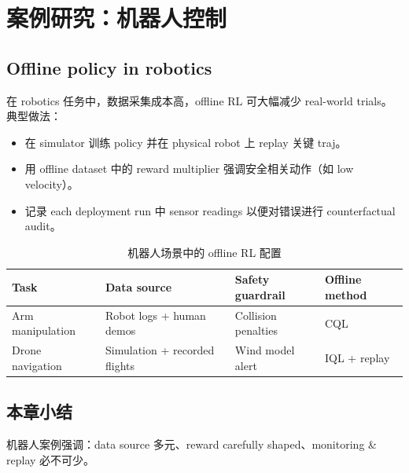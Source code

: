 \section{案例研究：机器人控制}

\subsection{Offline policy in robotics}

在 robotics 任务中，数据采集成本高，offline RL 可大幅减少 real-world trials。典型做法：

\begin{itemize}
    \item 在 simulator 训练 policy 并在 physical robot 上 replay 关键 traj。
    \item 用 offline dataset 中的 reward multiplier 强调安全相关动作（如 low velocity）。
    \item 记录 each deployment run 中 sensor readings 以便对错误进行 counterfactual audit。
\end{itemize}

\begin{table}[H]
\centering
\begin{tabular}{p{} p{} p{} p{}}
\toprule
Task & Data source & Safety guardrail & Offline method \\
\midrule
Arm manipulation & Robot logs + human demos & Collision penalties & CQL \\
Drone navigation & Simulation + recorded flights & Wind model alert & IQL + replay \\
\bottomrule
\end{tabular}
\caption{机器人场景中的 offline RL 配置}
\end{table}

\subsection{本章小结}

机器人案例强调：data source 多元、reward carefully shaped、monitoring & replay 必不可少。


